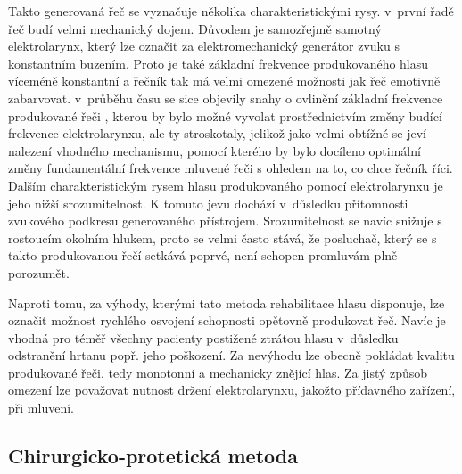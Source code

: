 
Takto generovaná řeč se vyznačuje několika charakteristickými rysy. v~první
řadě řeč budí velmi mechanický dojem. Důvodem je samozřejmě samotný
elektrolarynx, který lze označit za elektromechanický generátor zvuku s
konstantním buzením. Proto je také základní frekvence produkovaného hlasu víceméně konstantní a řečník tak má velmi omezené možnosti jak řeč emotivně zabarvovat. v~průběhu času se sice objevily snahy o ovlinění základní frekvence produkované řeči \cite{Kikuchi2004, Uemi1994, Goldstein2004}, kterou by bylo možné vyvolat prostřednictvím změny budící frekvence elektrolarynxu, ale ty stroskotaly, jelikož jako velmi obtížné se jeví nalezení vhodného mechanismu, pomocí kterého by bylo docíleno optimální změny fundamentální frekvence mluvené řeči s ohledem na to, co chce řečník říci. Dalším charakteristickým rysem hlasu produkovaného pomocí elektrolarynxu je jeho nižší srozumitelnost. K tomuto jevu dochází v~důsledku přítomnosti zvukového podkresu generovaného přístrojem. Srozumitelnost se navíc snižuje s rostoucím okolním hlukem, proto se velmi často stává, že posluchač, který se s takto produkovanou řečí setkává poprvé, není schopen promluvám plně porozumět.

Naproti tomu, za výhody, kterými tato metoda rehabilitace hlasu disponuje, lze označit možnost rychlého
osvojení schopnosti opětovně produkovat řeč. Navíc je vhodná pro téměř všechny pacienty
postižené ztrátou hlasu v~důsledku odstranění hrtanu popř. jeho poškození.
Za nevýhodu lze obecně pokládat kvalitu produkované řeči, tedy monotonní a
mechanicky znějící hlas. Za jistý způsob omezení lze považovat nutnost držení elektrolarynxu, jakožto přídavného zařízení, při mluvení.




\subsection{Chirurgicko-protetická metoda} %
\label{chap:cause:treatment:tracheo}

